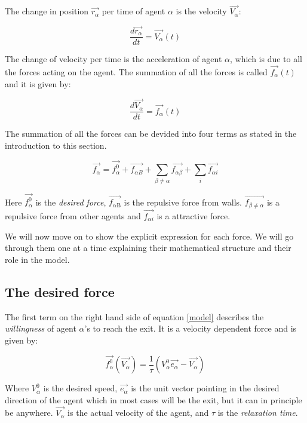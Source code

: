 The change in position $ \vec{r_{\alpha}} $ per time of agent $\alpha$ is the 
velocity $ \vec{V_{\alpha}} $:

\begin{equation}
		\frac{d \vec{r_{\alpha}}}{dt} = \vec{V_{\alpha}} \left( t \right)
\end{equation}

The change of velocity per time is the acceleration of agent $\alpha$, which 
is due to all the forces acting on the agent. The summation of all the forces 
is called $\vec{f_{\alpha}} \left( t \right)$ and it is given by:

\begin{equation}
    \frac{d \vec{V_{\alpha}}}{dt} = \vec{f_{\alpha}} \left( t \right) 
\end{equation}

The summation of all the forces can be devided into four terms as stated in 
the introduction to this section.

\begin{equation}\label{model}
    \vec{f_{\alpha}} = \vec{f^{0}_{\alpha}} + \vec{f_{\alpha B}} +
    \sum_{\beta \neq \alpha} \vec{f_{\alpha \beta}} +  
    \sum_{i} \vec{f_{\alpha i}} 
\end{equation}

Here $\vec{f_{\alpha}^{0}}$ is the \emph{desired force}, $\vec{f_{\alpha 
\text{B}}}$ is the repulsive force from walls. $\vec{f_{\beta \neq \alpha}}$ 
is a repulsive force from other agents and $\vec{f_{\alpha i}}$ is a 
attractive force.

We will now move on to show the explicit expression for each force. We will go 
through them one at a time explaining their mathematical structure and their 
role in the model.

\subsection{The desired force}
The first term on the right hand side of equation \eqref{model} describes the 
\emph{willingness} of agent $\alpha$'s to reach the exit. It is a velocity 
dependent force and is given by:

\begin{equation}\label{relaxtime}
	\vec{f^{0}_{\alpha}}\left( \vec{V_{\alpha}} \right) =
    \frac{1}{\tau}
    \left( V_{\alpha}^{0} \vec{e_{\alpha}} - \vec{V_{\alpha}} \right)
\end{equation}

Where $V_{\alpha}^{0}$ is the desired speed, $ \vec{e_{\alpha}} $ is the unit 
vector pointing in the desired direction of the agent which in most cases will 
be the exit, but it can in principle be anywhere.  $\vec{V_{\alpha}}$ is the 
actual velocity of the agent, and $\tau$ is the \emph{relaxation time}.

